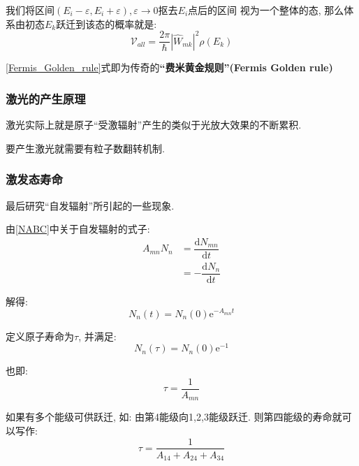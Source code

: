 \documentclass[a4paper, 11pt]{article}
\begin{document}
\begin{spacing}{1.2}
          我们将区间$(E_i-\varepsilon, E_i+\varepsilon), \varepsilon\to0$抠去$E_i$点后的区间
          视为一个整体的态, 那么体系由初态$E_k$跃迁到该态的概率就是:         
          \begin{equation}
            \label{Fermis_Golden_rule}
            \mathcal{V}_{all} = \frac{2\pi}{\hbar}|\hat{W}_{mk}|^2\rho(E_k)
          \end{equation} 

          \eqref{Fermis_Golden_rule}式即为传奇的\textbf{``费米黄金规则''(Fermis Golden rule)}

        \subsubsection{激光的产生原理}
          激光实际上就是原子``受激辐射''产生的类似于光放大效果的不断累积.

          要产生激光就需要有粒子数翻转机制.
        \subsubsection{激发态寿命}
          最后研究``自发辐射''所引起的一些现象.
          
          由\eqref{NABC}中关于自发辐射的式子:
          \begin{equation}
            \begin{aligned}
              A_{mn}N_n &= \dfrac{\mathrm{d}N_{mn}}{\mathrm{d}t} \\ 
                        &= -\dfrac{\mathrm{d}N_{n}}{\mathrm{d}t}                           
            \end{aligned}
          \end{equation}

          解得:
          \begin{equation}
            N_n(t) = N_n(0)\mathrm{e}^{-A_{mn}t}
          \end{equation}
          
          定义原子寿命为$\tau$, 并满足:
          \begin{equation}
            N_n(\tau) = N_n(0)\mathrm{e}^{-1}
          \end{equation}
          
          也即:
          \begin{equation}
            \tau = \frac{1}{A_{mn}}
          \end{equation}

          如果有多个能级可供跃迁, 如: 由第4能级向1,2,3能级跃迁. 则第四能级的寿命就可以写作:
          \begin{equation}
            \tau = \frac{1}{A_{14}+A_{24}+A_{34}}
          \end{equation}


\end{spacing}
\end{document}
